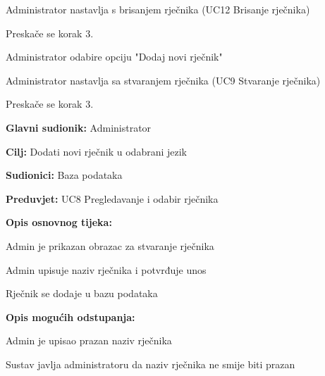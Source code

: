 \begin{packed_item}
\begin{packed_item}
\begin{packed_enum}
			\item Administrator nastavlja s brisanjem rječnika (UC12 Brisanje rječnika)
			\item Preskače se korak 3.
			
		\end{packed_enum}
		\item[2.b] Administrator odabire opciju "Dodaj novi rječnik"
		\item[] \begin{packed_enum}
			
			\item Administrator nastavlja sa stvaranjem rječnika (UC9 Stvaranje rječnika)
			\item Preskače se korak 3.
			
		\end{packed_enum}
		
	\end{packed_item}
	
\end{packed_item}

\noindent {}
\begin{packed_item}

	\item \textbf{Glavni sudionik: } Administrator
	\item \textbf{Cilj: } Dodati novi rječnik u odabrani jezik
	\item \textbf{Sudionici: } Baza podataka
	\item \textbf{Preduvjet: } UC8 Pregledavanje i odabir rječnika
	\item  \textbf{Opis osnovnog tijeka:}
	
	\item[] \begin{packed_enum}
		
		\item Admin je prikazan obrazac za stvaranje rječnika
		\item Admin upisuje naziv rječnika i potvrđuje unos
		\item Rječnik se dodaje u bazu podataka

	\end{packed_enum}

	\item  \textbf{Opis mogućih odstupanja:}
	
	\item[] \begin{packed_item}

		\item[2.a] Admin je upisao prazan naziv rječnika
		\item[] \begin{packed_enum}
			
			\item Sustav javlja administratoru da naziv rječnika ne smije biti prazan
			
		\end{packed_enum}
		
	\end{packed_item}

\end{packed_item}


